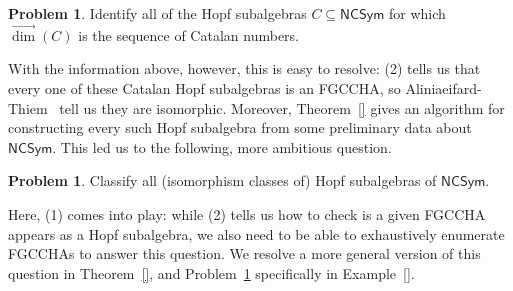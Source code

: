 \documentclass[11pt]{amsart}
\theoremstyle{definition}
\newtheorem{problem}[theorem]{Problem}
\numberwithin{equation}{section}
\newcommand{\FGCCHA}{\textsf{FGCCHA}\xspace}
\newcommand{\FGCCHAs}{\textsf{FGCCHA}s\xspace}
\newcommand{\vecdim}{\overrightarrow{\dim}}
\begin{document}
\begin{problem}
\label{prob1}
Identify all of the Hopf subalgebras $C \subseteq \mathsf{NCSym}$ for which $\vecdim(C)$ is the sequence of Catalan numbers.
\end{problem}

With the information above, however, this is easy to resolve:
(2) tells us that every one of these Catalan Hopf subalgebras is an \FGCCHA,
so Aliniaeifard-Thiem~\cite{AT20} tell us they are isomorphic.
Moreover, Theorem~\ref{} gives an algorithm for constructing
every such Hopf subalgebra from some preliminary data about $\mathsf{NCSym}$.
This led us to the following, more ambitious question.

\begin{problem}
\label{prob2}
Classify all (isomorphism classes of) Hopf subalgebras of $\mathsf{NCSym}$.
\end{problem}

Here, (1) comes into play: while (2) tells us how to check is a given \FGCCHA appears as a Hopf subalgebra, we also need to be able to exhaustively enumerate \FGCCHAs to answer this question.
We resolve a more general version of this question in Theorem~\ref{}, and Problem~\ref{prob2} specifically in Example~\ref{}.  

%
%
%
%
%

\end{document}

